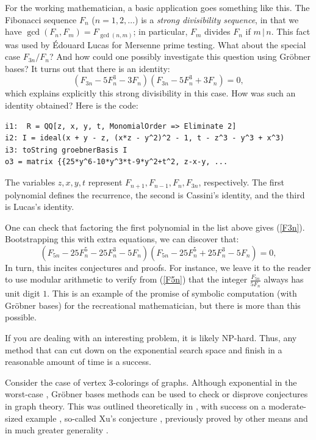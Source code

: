 
For the working mathematician, a basic application goes something like this.  The Fibonacci sequence $F_n$ ($n= 1, 2, \ldots$) is a \textit{strong divisibility sequence}, in that we have $\gcd(F_n, F_m) = F_{\gcd(n,m)}$; in particular, $F_m$ divides $F_n$ if $m \, | \, n$.  This fact was used by \'Edouard Lucas for Mersenne prime testing.  What about the special case $F_{3n}/F_n$?  And how could one possibly investigate this question using Gr\"obner bases?  It turns out that there is an identity:
\begin{equation}\label{F3n}
(F_{3n} - 5 F_n^3 - 3 F_n)(F_{3n} - 5 F_n^3 + 3 F_n) = 0,
\end{equation}
which explains explicitly this strong divisibility in this case.  How was such an identity obtained?  Here is the code:
\begin{M2}
\begin{verbatim}
i1:  R = QQ[z, x, y, t, MonomialOrder => Eliminate 2]
i2: I = ideal(x + y - z, (x*z - y^2)^2 - 1, t - z^3 - y^3 + x^3)
i3: toString groebnerBasis I
o3 = matrix {{25*y^6-10*y^3*t-9*y^2+t^2, z-x-y, ...
\end{verbatim}
\end{M2}  
\medskip
The variables $z,x,y,t$ represent $F_{n+1}, F_{n-1}, F_n, F_{3n}$, respectively.  The first polynomial defines the recurrence, the second is Cassini's identity, and the third is Lucas's identity.

One can check that factoring the first polynomial in the list above gives (\ref{F3n}).  Bootstrapping this with extra equations, we can discover that:
\begin{equation}\label{F5n}
(F_{5n} - 25 F_n^5 - 25 F_n^3 - 5 F_n)(F_{5n} - 25 F_n^5 + 25 F_n^3 - 5 F_n) = 0,
\end{equation}
In turn, this incites conjectures and proofs.  
For instance, we leave it to the reader to use modular arithmetic to verify from (\ref{F5n}) that the integer $\frac{F_{5n}}{5F_n}$ always has unit digit $1$.  This is an example of the promise of symbolic computation (with Gr\"obner bases) for the recreational mathematician, but there is more than this possible.

If you are dealing with an interesting problem, it is likely NP-hard.  Thus, any method that can cut down on the exponential search space and finish in a reasonable amount of time is a success.  

Consider the case of vertex 3-colorings of graphs.  Although exponential in the worst-case \cite[pp. 400]{yap2000fundamental}, Gr\"obner bases methods can be used to check or disprove conjectures in graph theory.  This was outlined theoretically in \cite{bayer1982division}, with success on a moderate-sized example \cite{hillar2008algebraic}, so-called Xu's conjecture \cite{shaoji1990size}, previously proved by other means and in much greater generality \cite{akbari2001kr}.

